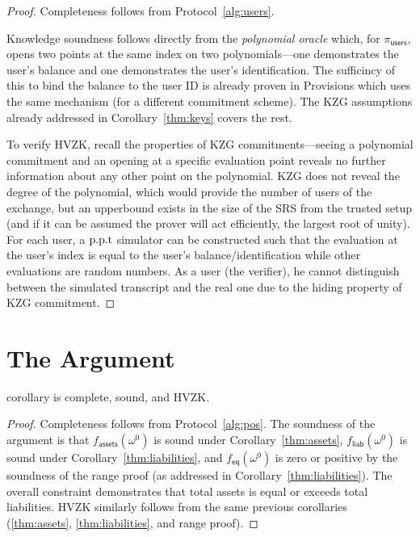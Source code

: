 \begin{proof}
Completeness follows from Protocol~\ref{alg:users}. 

Knowledge soundness follows directly from the \textit{polynomial oracle} which, for $\pi_\mathsf{users}$, opens two points at the same index on two polynomials---one demonstrates the user's balance and one demonstrates the user's identification. The sufficincy of this to bind the balance to the user ID is already proven in Provisions which uses the same mechanism (for a different commitment scheme). The KZG assumptions already addressed in Corollary~\ref{thm:keys} covers the rest. 

To verify HVZK, recall the properties of KZG commitments---seeing a polynomial commitment and an opening at a specific evaluation point reveals no further information about any other point on the polynomial. KZG does not reveal the degree of the polynomial, which would provide the number of users of the exchange, but an upperbound exists in the size of the SRS from the trusted setup (and if it can be assumed the prover will act efficiently, the largest root of unity). For each user, a $\text{p.p.t}$ simulator can be constructed such that the evaluation at the user's index is equal to the user's balance/identification while other evaluations are random numbers. As a user (the verifier), he cannot distinguish between the simulated transcript and the real one due to the hiding property of KZG commitment. 
\end{proof}


\section{The \pos Argument}

\begin{restatable}{corollary}{}
\label{thm:solvency} 
\pos is complete, sound, and HVZK. 
\end{restatable}

\begin{proof}
Completeness follows from Protocol~\ref{alg:pos}. The soundness of the argument is that $f_\mathsf{assets}(\omega^0)$ is sound under Corollary~\ref{thm:assets}, $f_\mathsf{liab}(\omega^0)$ is sound under Corollary~\ref{thm:liabilities}, and $f_\mathsf{eq}(\omega^0)$ is zero or positive by the soundness of the range proof (as addressed in Corollary~\ref{thm:liabilities}). The overall constraint demonstrates that total assets is equal or exceeds total liabilities. HVZK similarly follows from the same previous corollaries (\ref{thm:assets}, \ref{thm:liabilities}, and range proof).
\end{proof}

